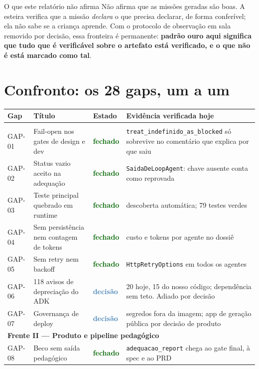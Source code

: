\documentclass[11pt,a4paper]{article}
\newcommand{\ok}{\textcolor{DarkGreen}{\textbf{fechado}}}
\newcommand{\decisao}{\textcolor{SteelBlue}{\textbf{decisão}}}
\begin{document}
\begin{ressalvabox}{O que este relatório não afirma}
Não afirma que as missões geradas são boas. A esteira verifica que a missão \emph{declara} o que precisa declarar, de forma conferível; ela não sabe se a criança aprende. Com o protocolo de observação em sala removido por decisão, essa fronteira é permanente: \textbf{padrão ouro aqui significa que tudo que é verificável sobre o artefato está verificado, e o que não é está marcado como tal}.
\end{ressalvabox}

\section{Confronto: os 28 gaps, um a um}

\small
\begin{longtable}{@{}p{1.5cm} p{6.0cm} p{1.6cm} p{6.0cm}@{}}
\toprule
\textbf{Gap} & \textbf{Título} & \textbf{Estado} & \textbf{Evidência verificada hoje} \\
\midrule
\endhead
\bottomrule
\endfoot
\multicolumn{4}{l}{\textbf{\color{NavyBlue}Frente I --- Execução, fail-safe e robustez}} \\
\midrule
GAP-01 & Fail-open nos gates de design e dev & \ok & \texttt{treat\_indefinido\_as\_blocked} só sobrevive no comentário que explica por que saiu \\
GAP-02 & Status vazio aceito na adequação & \ok & \texttt{SaidaDeLoopAgent}: chave ausente conta como reprovada \\
GAP-03 & Teste principal quebrado em runtime & \ok & descoberta automática; 79 testes verdes \\
GAP-04 & Sem persistência nem contagem de tokens & \ok & custo e tokens por agente no dossiê \\
GAP-05 & Sem retry nem backoff & \ok & \texttt{HttpRetryOptions} em todos os agentes \\
GAP-06 & 118 avisos de depreciação do ADK & \decisao & 20 hoje, 15 do nosso código; dependência sem teto. Adiado por decisão \\
GAP-07 & Governança de deploy & \decisao & segredos fora da imagem; app de geração pública por decisão de produto \\
\midrule
\multicolumn{4}{l}{\textbf{\color{NavyBlue}Frente II --- Produto e pipeline pedagógico}} \\
\midrule
GAP-08 & Beco sem saída pedagógico & \ok & \texttt{adequacao\_report} chega ao gate final, à spec e ao PRD \\

\end{longtable}
\end{document}
